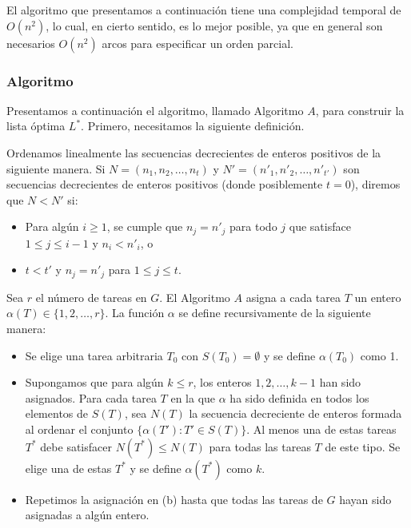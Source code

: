 \documentclass[14pt]{extarticle}
\begin{document}
El algoritmo que presentamos a continuación tiene una complejidad temporal de $O(n^2)$, lo cual, en cierto sentido, es lo mejor posible, ya que en general son necesarios $O(n^2)$ arcos para especificar un orden parcial.

\subsubsection*{Algoritmo}

Presentamos a continuación el algoritmo, llamado Algoritmo $A$, para construir la lista óptima $L^*$. Primero, necesitamos la siguiente definición.

Ordenamos linealmente las secuencias decrecientes de enteros positivos de la siguiente manera. Si $N = (n_1, n_2, \ldots, n_t)$ y $N' = (n'_1, n'_2, \ldots, n'_{t'})$ son secuencias decrecientes de enteros positivos (donde posiblemente $t = 0$), diremos que $N < N'$ si:

\begin{itemize}
    \item Para algún $i \geq 1$, se cumple que $n_j = n'_j$ para todo $j$ que satisface $1 \leq j \leq i - 1$ y $n_i < n'_i$, o
    \item $t < t'$ y $n_j = n'_j$ para $1 \leq j \leq t$.
\end{itemize}

Sea $r$ el número de tareas en $G$. El Algoritmo $A$ asigna a cada tarea $T$ un entero $\alpha(T) \in \{1, 2, \ldots, r\}$. La función $\alpha$ se define recursivamente de la siguiente manera:

\begin{itemize}
    \item Se elige una tarea arbitraria $T_0$ con $S(T_0) = \emptyset$ y se define $\alpha(T_0)$ como 1.
    \item Supongamos que para algún $k \leq r$, los enteros $1, 2, \ldots, k - 1$ han sido asignados. Para cada tarea $T$ en la que $\alpha$ ha sido definida en todos los elementos de $S(T)$, sea $N(T)$ la secuencia decreciente de enteros formada al ordenar el conjunto $\{\alpha(T'): T' \in S(T)\}$. Al menos una de estas tareas $T^*$ debe satisfacer $N(T^*) \leq N(T)$ para todas las tareas $T$ de este tipo. Se elige una de estas $T^*$ y se define $\alpha(T^*)$ como $k$.
    \item Repetimos la asignación en (b) hasta que todas las tareas de $G$ hayan sido asignadas a algún entero.
\end{itemize}
\end{document}
